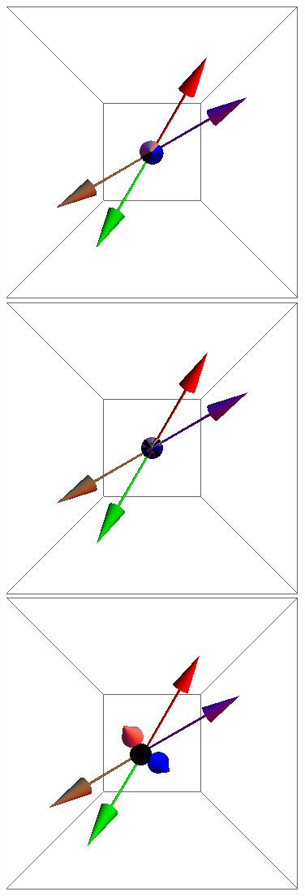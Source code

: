 \documentclass{article}
\begin{document}
\begin{figure}[ht]
\centering
\includegraphics[scale=0.24]{100/1S005to000G.png}
\includegraphics[scale=0.24]{100/3S005to000G.png}
\includegraphics[scale=0.24]{100/55S005to000G.png}

\end{figure}
\end{document}

